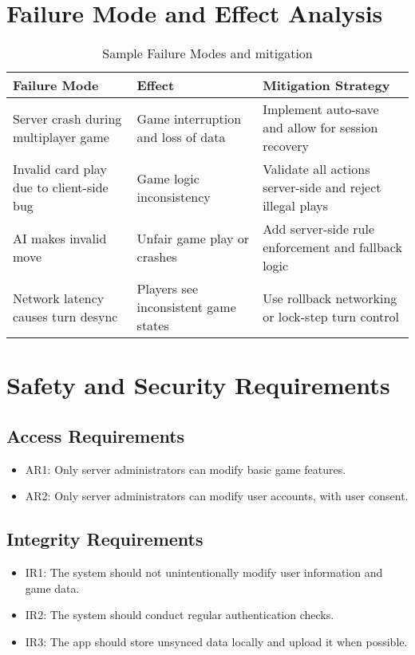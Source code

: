\documentclass[12pt]{article}
\begin{document}
\section{Failure Mode and Effect Analysis}
\begin{table}[H]
\centering
\begin{tabular}{|p{4cm}|p{4cm}|p{5cm}|}
\hline
\textbf{Failure Mode} & \textbf{Effect} & \textbf{Mitigation Strategy} \\
\hline
Server crash during multiplayer game & Game interruption and loss of data & Implement auto-save and allow for session recovery \\
\hline
Invalid card play due to client-side bug & Game logic inconsistency & Validate all actions server-side and reject illegal plays \\
\hline
AI makes invalid move & Unfair game play or crashes & Add server-side rule enforcement and fallback logic \\
\hline
Network latency causes turn desync & Players see inconsistent game states & Use rollback networking or lock-step turn control \\
\hline
\end{tabular}
\caption{Sample Failure Modes and mitigation}
\end{table}

\section{Safety and Security Requirements}
\subsection{Access Requirements}
\begin{itemize}
    \item AR1: Only server administrators can modify basic game features.
    \item AR2: Only server administrators can modify user accounts, with user consent.
\end{itemize}

\subsection{Integrity Requirements}
\begin{itemize}
    \item IR1: The system should not unintentionally modify user information and game data.
    \item IR2: The system should conduct regular authentication checks.
    \item IR3: The app should store unsynced data locally and upload it when possible.
\end{itemize}
\end{document}

